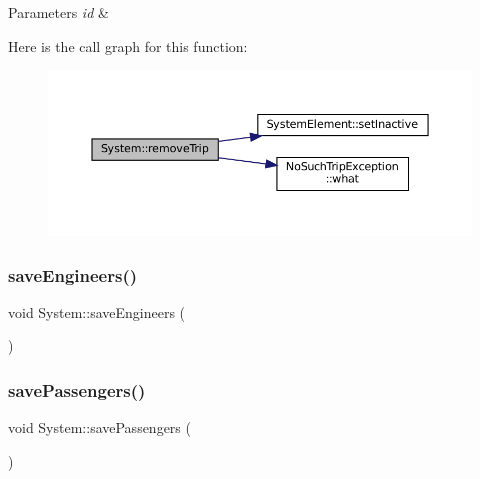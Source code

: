 \begin{DoxyParams}{Parameters}
{\em id} & \\
\hline
\end{DoxyParams}
Here is the call graph for this function\+:
\nopagebreak
\begin{figure}[H]
\begin{center}
\leavevmode
\includegraphics[width=350pt]{classSystem_a38046fbc01e62b7ff06799c2f8bc8ef6_cgraph}
\end{center}
\end{figure}
\mbox{\label{classSystem_a8cfeb93474f802f30212fad659b10937}} 
\subsubsection{\texorpdfstring{save\+Engineers()}{saveEngineers()}}
{\footnotesize\ttfamily void System\+::save\+Engineers (\begin{DoxyParamCaption}{ }\end{DoxyParamCaption})}

\mbox{\label{classSystem_a43da2cea53bae53723d572855cfbe817}} 
\subsubsection{\texorpdfstring{save\+Passengers()}{savePassengers()}}
{\footnotesize\ttfamily void System\+::save\+Passengers (\begin{DoxyParamCaption}{ }\end{DoxyParamCaption})}

